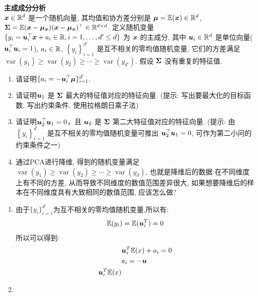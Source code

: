 \documentclass[answers]{exam}  %
\begin{document}
\begin{questions}
    \question [20] \textbf{主成成分分析} \\
    ${\boldsymbol{x}} \in \mathbb{R}^{d}$ 是一个随机向量, 其均值和协方差分别是 $\boldsymbol{\mu}=\mathbb{E}({\boldsymbol{x}}) \in \mathbb{R}^{d}$, $\boldsymbol{\Sigma}=\mathbb{E}({\boldsymbol{x}}-\boldsymbol{\mu}_{\boldsymbol{x}})({\boldsymbol{x}}-\boldsymbol{\mu}_{\boldsymbol{x}})^{\top} \in \mathbb{R}^{d \times  d}$. 定义随机变量 $\{y_{i}=\boldsymbol{u}_{i}^{\top} {\boldsymbol{x}}+a_{i} \in \mathbb{R}, i=1, \ldots, {d'} \leq d\}$ 为 ${\boldsymbol{x}}$ 的主成分, 其中 $\boldsymbol{u}_{i} \in \mathbb{R}^{d}$ 是单位向量($\boldsymbol{u}_i^\top \boldsymbol{u}_i = 1$), $a_{i} \in \mathbb{R}$, $\left\{y_{i}\right\}_{i=1}^{{d'}}$ 是互不相关的零均值随机变量, 它们的方差满足 $\operatorname{var}\left(y_{1}\right) \geq \operatorname{var}\left(y_{2}\right) \geq \cdots \geq \operatorname{var}\left(y_{{d'}}\right)$. 假设 $\boldsymbol{\Sigma}$ 没有重复的特征值.
    \begin{enumerate}
        \item  请证明$\{a_{i}=-\boldsymbol{u}_{i}^{\top} \boldsymbol{\mu}\}_{i=1}^{d'}$.
        \item 请证明$\boldsymbol{u}_{1}$ 是 $\boldsymbol{\Sigma}$ 最大的特征值对应的特征向量. (提示: 写出要最大化的目标函数, 写出约束条件, 使用拉格朗日乘子法)
        \item 请证明$\boldsymbol{u}_{2}^{\top} \boldsymbol{u}_{1}=0$，且 $\boldsymbol{u}_{2}$ 是 $\boldsymbol{\Sigma}$ 第二大特征值对应的特征向量. (提示: 由 $\left\{y_{i}\right\}_{i=1}^{d}$ 是互不相关的零均值随机变量可推出 $\boldsymbol{u}_{2}^{\top} \boldsymbol{u}_{1}=0$, 可作为第二小问的约束条件之一)
        \item 通过PCA进行降维, 得到的随机变量满足$\operatorname{var}\left(y_{1}\right) \geq \operatorname{var}\left(y_{2}\right) \geq \cdots \geq \operatorname{var}\left(y_{d}\right)$, 也就是降维后的数据 在不同维度上有不同的方差, 从而导致不同维度的数值范围差异很大, 如果想要降维后的样本在不同维度具有大致相同的数值范围, 应该怎么做?
    \end{enumerate}
    \begin{solution}
        \begin{enumerate}
            \item 由于$\{y_i\}_{i=1}^{d'}$为互不相关的零均值随机变量,所以有:
                  \begin{align*}
                      \mathbb{E}(y_i)=\mathbb{E}(\boldsymbol{u}_i^T)=0
                  \end{align*}
                  所以可以得到:
                  \begin{align*}
                       & \boldsymbol{u}_i^T\mathbb{E}(x)+a_i=0 \\
                       & a_i=-\boldsymbol{u}                   \\\boldsymbol{u}_i^T\mathbb{E}(x)
                  \end{align*}
            \item

\end{enumerate}
\end{solution}
\end{questions}
\end{document}
